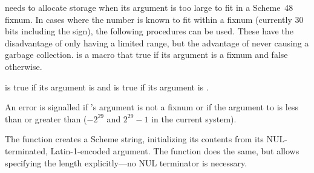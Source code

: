  needs to allocate storage when
 its argument is too large to fit in a Scheme~48 fixnum.
In cases where the number is known to fit within a fixnum (currently 30 bits
 including the sign), the following procedures can be used.
These have the disadvantage of only having a limited range, but
 the advantage of never causing a garbage collection.
 is a macro that true if its argument is a fixnum
 and false otherwise.

\begin{protos}
\end{protos}

\noindent {} is true if its argument is 
 and  is true if its argument is .

\begin{protos}
\end{protos}

\noindent An error is signalled if 's argument
 is not a fixnum or if the argument to  is less than
  or greater than 
 ($-2^{29}$ and $2^{29}-1$ in the current system).

\begin{protos}
\end{protos}
%
The  function creates a Scheme
string, initializing its contents from its NUL-terminated,
Latin-1-encoded argument.  The 
function does the same, but allows specifying the length explicitly---no NUL
terminator is necessary.


